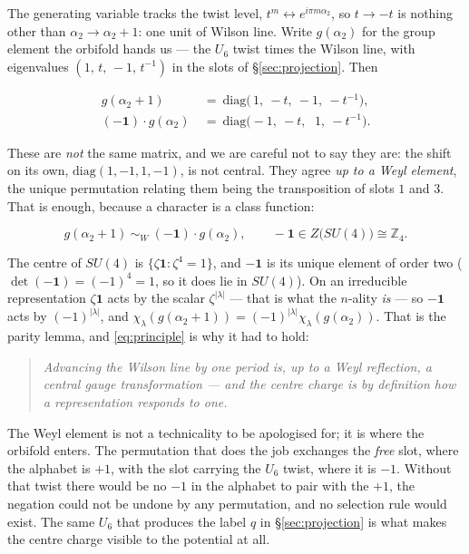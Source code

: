 \documentclass[11pt,a4paper]{article}
\newcommand{\ZZ}{\mathbb{Z}}
\newcommand{\lam}{|\lambda|}
\begin{document}
The generating variable tracks the twist level, $t^m\leftrightarrow e^{i\pi m\alpha_2}$, so
$t\to-t$ is nothing other than $\alpha_2\to\alpha_2+1$: one unit of Wilson line. Write
$g(\alpha_2)$ for the group element the orbifold hands us --- the $U_6$ twist times the
Wilson line, with eigenvalues $(1,\,t,\,-1,\,t^{-1})$ in the slots of \S\ref{sec:projection}.
Then

\[
\begin{aligned}
g(\alpha_2{+}1)\ &=\ \mathrm{diag}\big(\,1,\ -t,\ -1,\ -t^{-1}\big),\\[2pt]
(-\mathbf{1})\cdot g(\alpha_2)\ &=\ \mathrm{diag}\big(-1,\ -t,\ \ \,1,\ -t^{-1}\big).
\end{aligned}
\]

These are \emph{not} the same matrix, and we are careful not to say they are: the shift on its
own, $\mathrm{diag}(1,-1,1,-1)$, is not central. They agree \emph{up to a Weyl element}, the
unique permutation relating them being the transposition of slots $1$ and $3$. That is
enough, because a character is a class function:

\begin{equation}\label{eq:principle}
\boxed{\ g(\alpha_2{+}1)\ \sim_{W}\ (-\mathbf{1})\cdot g(\alpha_2),
\qquad -\mathbf{1}\in Z\big(SU(4)\big)\cong\ZZ_4 .\ }
\end{equation}

The centre of $SU(4)$ is $\{\zeta\mathbf{1}:\zeta^4=1\}$, and $-\mathbf{1}$ is its unique
element of order two ($\det(-\mathbf{1})=(-1)^4=1$, so it does lie in $SU(4)$). On an
irreducible representation $\zeta\mathbf{1}$ acts by the scalar $\zeta^{\lam}$ --- that is
what the $n$-ality \emph{is} --- so $-\mathbf{1}$ acts by $(-1)^{\lam}$, and
$\chi_\lambda(g(\alpha_2{+}1))=(-1)^{\lam}\chi_\lambda(g(\alpha_2))$. That is the parity
lemma, and \eqref{eq:principle} is why it had to hold:

\begin{quote}
\emph{Advancing the Wilson line by one period is, up to a Weyl reflection, a central gauge
transformation --- and the centre charge is by definition how a representation responds to
one.}
\end{quote}

The Weyl element is not a technicality to be apologised for; it is where the orbifold enters.
The permutation that does the job exchanges the \emph{free} slot, where the alphabet is $+1$,
with the slot carrying the $U_6$ twist, where it is $-1$. Without that twist there would be
no $-1$ in the alphabet to pair with the $+1$, the negation could not be undone by any
permutation, and no selection rule would exist. The same $U_6$ that produces the label $q$ in
\S\ref{sec:projection} is what makes the centre charge visible to the potential at all.
\end{document}
